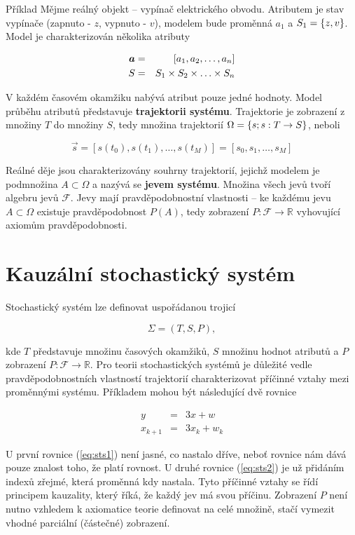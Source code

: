 \begin{note}{Příklad}
Mějme reálný objekt -- vypínač elektrického obvodu. Atributem je stav vypínače (zapnuto - $z$, vypnuto - $v$), modelem bude proměnná $a_1$ a $S_1=\brs{z,v}$. Model je charakterizován několika atributy

\begin{eqnarray*}
\vec{a} & = & [\vecrow[a]]\\
S & = & S_1\times S_2 \times \ldots \times S_n
\end{eqnarray*}

V každém časovém okamžiku nabývá atribut pouze jedné hodnoty. Model průběhu atributů představuje \textbf{trajektorii systému}. Trajektorie je zobrazení z množiny $T$ do množiny $S$, tedy množina trajektorií $\Omega = \brs{s; s:T\to S}$, neboli

\[ \vec{s} = [s(t_0), s(t_1), \ldots, s(t_M)]=[s_0,s_1,\ldots, s_M] \]

Reálné děje jsou charakterizovány souhrny trajektorií, jejichž modelem je podmnožina $A\subset\Omega$ a nazývá se \textbf{jevem systému}. Množina všech jevů tvoří algebru jevů $\mathscr{F}$. Jevy mají pravděpodobnostní vlastnosti -- ke každému jevu $A\subset \Omega$ existuje pravděpodobnost $P(A)$, tedy zobrazení $P:\mathscr{F}\to\mathbb{R}$ vyhovující axiomům pravděpodobnosti.
\end{note}

\section{Kauzální stochastický systém}
Stochastický systém lze definovat uspořádanou trojicí

\[ \Sigma = (T,S,P), \]

kde $T$ představuje množinu časových okamžiků, $S$ množinu hodnot atributů a $P$ zobrazení $P:\mathscr{F}\to\mathbb{R}$. Pro teorii stochastických systémů je důležité vedle pravděpodobnostních vlastností trajektorií charakterizovat příčinné vztahy mezi proměnnými systému. Příkladem mohou být následující dvě rovnice

\begin{eqnarray}
y & = & 3x + w\label{eq:sts1}\\
x_{k+1} & = & 3x_k + w_k\label{eq:sts2}
\end{eqnarray}

U první rovnice (\ref{eq:sts1}) není jasné, co nastalo dříve, neboť rovnice nám dává pouze znalost toho, že platí rovnost. U druhé rovnice (\ref{eq:sts2}) je už přidáním indexů zřejmé, která proměnná kdy nastala. Tyto příčinné vztahy se řídí principem kauzality, který říká, že každý jev má svou příčinu. Zobrazení $P$ není nutno vzhledem k axiomatice teorie definovat na celé množině, stačí vymezit vhodné parciální (částečné) zobrazení.

